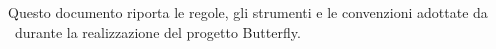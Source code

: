 Questo documento riporta le regole, gli strumenti e le convenzioni adottate da \gruppo\ durante la realizzazione del progetto Butterfly.
